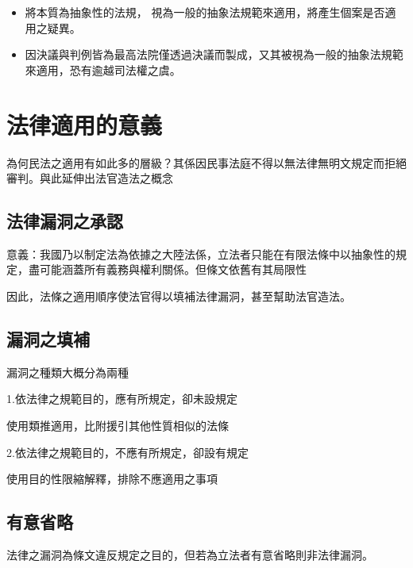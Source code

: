 \documentclass[
]{book}
\begin{document}
\begin{itemize}
\item
  將本質為抽象性的法規， 視為一般的抽象法規範來適用，將產生個案是否適用之疑異。
\item
  因決議與判例皆為最高法院僅透過決議而製成，又其被視為一般的抽象法規範來適用，恐有逾越司法權之虞。
\end{itemize}

\hypertarget{ux6cd5ux5f8bux9069ux7528ux7684ux610fux7fa9}{%
\section*{法律適用的意義}\label{ux6cd5ux5f8bux9069ux7528ux7684ux610fux7fa9}}

為何民法之適用有如此多的層級？其係因民事法庭不得以無法律無明文規定而拒絕審判。與此延伸出法官造法之概念

\hypertarget{ux6cd5ux5f8bux6f0fux6d1eux4e4bux627fux8a8d}{%
\subsection{法律漏洞之承認}\label{ux6cd5ux5f8bux6f0fux6d1eux4e4bux627fux8a8d}}

意義：我國乃以制定法為依據之大陸法係，立法者只能在有限法條中以抽象性的規定，盡可能涵蓋所有義務與權利關係。但條文依舊有其局限性

因此，法條之適用順序使法官得以填補法律漏洞，甚至幫助法官造法。

\hypertarget{ux6f0fux6d1eux4e4bux586bux88dc}{%
\subsection{漏洞之填補}\label{ux6f0fux6d1eux4e4bux586bux88dc}}

漏洞之種類大概分為兩種

1.依法律之規範目的，應有所規定，卻未設規定

使用類推適用，比附援引其他性質相似的法條

2.依法律之規範目的，不應有所規定，卻設有規定

使用目的性限縮解釋，排除不應適用之事項

\hypertarget{ux6709ux610fux7701ux7565}{%
\subsection{有意省略}\label{ux6709ux610fux7701ux7565}}

法律之漏洞為條文違反規定之目的，但若為立法者有意省略則非法律漏洞。
\end{document}
